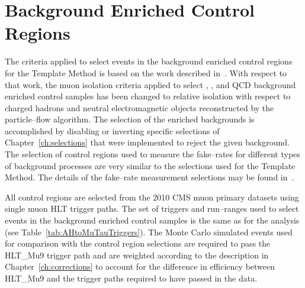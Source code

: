 \section{Background Enriched Control Regions}
\label{sec:controlregions}
%
The criteria applied to select events in the background enriched control regions
for the Template Method is based on the work described
in~\cite{CMS_AN_2010-088}.  With respect to that work, the muon isolation
criteria applied to select \ZMM, \WpJets, \ttbarpJets and QCD background
enriched control samples has been changed to relative isolation with respect to
charged hadrons and neutral electromagnetic objects reconstructed by the
particle--flow algorithm.   The selection of the enriched backgrounds is
accomplished by disabling or inverting specific selections of
Chapter~\ref{ch:selections} that were implemented to reject the given
background.  The selection of control regions used to measure the fake--rates
for different types of background processes are very similar to the selections
used for the Template Method.  The details of the fake--rate measurement
selections may be found in~\cite{CMS-PAS-TAU-11-001}.

All control regions are selected from the 2010 CMS muon primary datasets using
single muon HLT trigger paths.  The set of triggers and run--ranges used to select events in the
background enriched control samples is the same as for the analysis (see
Table~\ref{tab:AHtoMuTauTriggers}).  The Monte Carlo simulated events used for
comparison with the control region selections are required to pass the HLT\_Mu9
trigger path and are weighted according to the description in
Chapter~\ref{ch:corrections} to account for the difference in
efficiency between HLT\_Mu9 and the trigger paths required to have passed in the
data.

